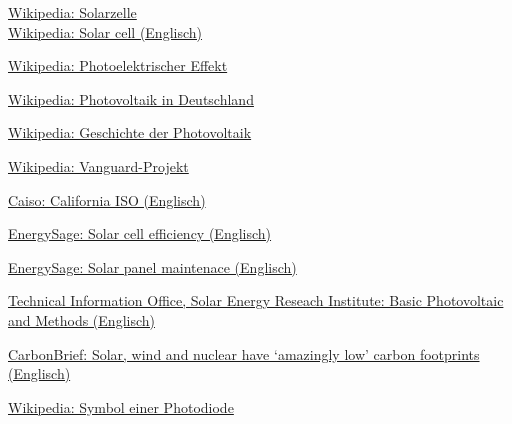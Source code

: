 \newpage
\begin{thebibliography}{9}
        \href{https://de.wikipedia.org/wiki/Solarzelle}{
            Wikipedia: Solarzelle
        }\\
        \href{https://en.wikipedia.org/wiki/Solar_cell}{
            Wikipedia: Solar cell (Englisch)
        }

        \href{https://de.wikipedia.org/wiki/Photoelektrischer_Effekt}{
            Wikipedia: Photoelektrischer Effekt
        }

        \href{https://de.wikipedia.org/wiki/Photovoltaik_in_Deutschland}{
            Wikipedia: Photovoltaik in Deutschland
        }

        \href{https://de.wikipedia.org/wiki/Geschichte_der_Photovoltaik}{
            Wikipedia: Geschichte der Photovoltaik
        }

        \href{https://de.wikipedia.org/wiki/Vanguard-Projekt}{
            Wikipedia: Vanguard-Projekt
        }

        \href{http://www.caiso.com/TodaysOutlook/Pages/index.html}{
            Caiso: California ISO (Englisch)
        }

        \href{https://news.energysage.com/what-are-the-most-efficient-solar-panels-on-the-market/}{
            EnergySage: Solar cell efficiency (Englisch)
        }

        \href{https://www.energysage.com/solar/101/solar-panel-maintenance/}{
            EnergySage: Solar panel maintenace (Englisch)
        }

        \href{https://www.nrel.gov/docs/legosti/old/1448.pdf}{
            Technical Information Office, Solar Energy Reseach Institute:
            Basic Photovoltaic and Methods (Englisch)
        }

        \href{https://www.carbonbrief.org/solar-wind-nuclear-amazingly-low-carbon-footprints}{
            CarbonBrief: Solar, wind and nuclear have ‘amazingly low’
            carbon footprints (Englisch)
        }

        \href{https://de.wikipedia.org/wiki/Datei:Symbol_Photodiode.svg}{
            Wikipedia: Symbol einer Photodiode
        }


\end{thebibliography}
